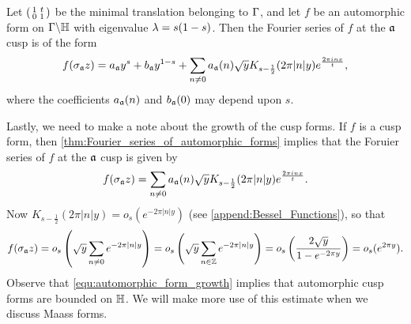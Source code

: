       \begin{theorem}\label{thm:Fourier_series_of_automorphic_forms}
        Let $\begin{psmallmatrix} 1 & t \\ 0 & 1 \end{psmallmatrix}$ be the minimal translation belonging to $\Gamma$, and let $f$ be an automorphic form on $\Gamma\backslash\mathbb{H}$ with eigenvalue $\lambda = s(1-s)$. Then the Fourier series of $f$ at the $\mathfrak{a}$ cusp is of the form
        \[
          f(\sigma_{\mathfrak{a}}z) = a_{\mathfrak{a}}y^{s}+b_{\mathfrak{a}}y^{1-s}+\sum_{n \neq 0}a_{\mathfrak{a}}(n)\sqrt{y}K_{s-\frac{1}{2}}(2\pi|n|y)e^{\frac{2\pi inx}{t}},
        \]
        where the coefficients $a_{\mathfrak{a}}(n)$ and $b_{\mathfrak{a}}(0)$ may depend upon $s$.
      \end{theorem}

      Lastly, we need to make a note about the growth of the cusp forms. If $f$ is a cusp form, then \cref{thm:Fourier_series_of_automorphic_forms} implies that the Foruier series of $f$ at the $\mathfrak{a}$ cusp is given by
      \[
        f(\sigma_{\mathfrak{a}}z) = \sum_{n \neq 0}a_{\mathfrak{a}}(n)\sqrt{y}K_{s-\frac{1}{2}}(2\pi|n|y)e^{\frac{2\pi inx}{t}}.
      \]
      Now $K_{s-\frac{1}{2}}(2\pi|n|y) = o_{s}(e^{-2\pi|n|y})$ (see \cref{append:Bessel_Functions}), so that
      \begin{equation}\label{equ:automorphic_form_growth}
        f(\sigma_{\mathfrak{a}}z) = o_{s}\left(\sqrt{y}\sum_{n \neq 0}e^{-2\pi|n|y}\right) = o_{s}\left(\sqrt{y}\sum_{n \in \mathbb{Z}}e^{-2\pi|n|y}\right) = o_{s}\left(\frac{2\sqrt{y}}{1-e^{-2\pi y}}\right) = o_{s}(e^{2\pi y}).
      \end{equation}
      Observe that \cref{equ:automorphic_form_growth} implies that automorphic cusp forms are bounded on $\mathbb{H}$. We will make more use of this estimate when we discuss Maass forms.
